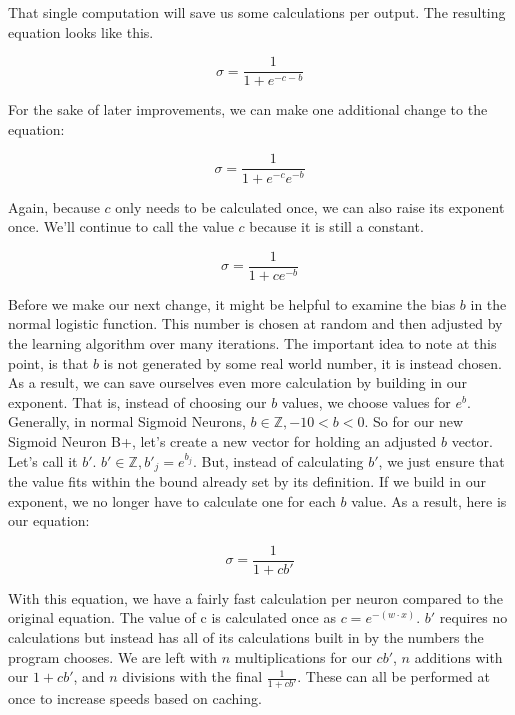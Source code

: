 \documentclass[10pt]{article}
\begin{document}
That single computation will save us some calculations per output. The resulting equation looks like this.

\begin{equation}
\sigma = \frac {1} {1+e^{-c-b}}
\end{equation}

For the sake of later improvements, we can make one additional change to the equation:

\begin{equation}
\sigma = \frac {1} {1+e^{-c}e^{-b}}
\end{equation}

Again, because $c$ only needs to be calculated once, we can also raise its exponent once. We'll continue to call the value $c$ because it is still a constant.

\begin{equation}
\sigma = \frac {1} {1+ce^{-b}}
\end{equation}

Before we make our next change, it might be helpful to examine the bias $b$ in the normal logistic function. This number is chosen at random and then adjusted by the learning algorithm over many iterations. The important idea to note at this point, is that $b$ is not generated by some real world number, it is instead chosen. As a result, we can save ourselves even more calculation by building in our exponent. That is, instead of choosing our $b$ values, we choose values for $e^{b}$. Generally, in normal Sigmoid Neurons, $b \in \mathbb{Z}, -10 < b < 0$. So for our new Sigmoid Neuron B+, let's create a new vector for holding an adjusted $b$ vector. Let's call it $b'$. $b' \in \mathbb{Z}, b'_{j} = e^{b_{j}}$. But, instead of calculating $b'$, we just ensure that the value fits within the bound already set by its definition. If we build in our exponent, we no longer have to calculate one for each $b$ value. As a result, here is our equation:

\begin{equation}
\sigma = \frac {1} {1+cb'}
\end{equation}

With this equation, we have a fairly fast calculation per neuron compared to the original equation. The value of c is calculated once as $c = e^{-(w \cdot x)}$. $b'$ requires no calculations but instead has all of its calculations built in by the numbers the program chooses. We are left with $n$ multiplications for our $cb'$, $n$ additions with our $1+cb'$, and $n$ divisions with the final $\frac {1} {1+cb'}$. These can all be performed at once to increase speeds based on caching.
\end{document}
